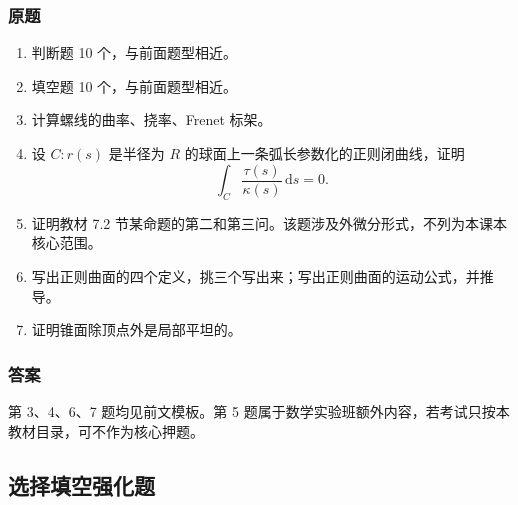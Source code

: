 \documentclass[UTF8,12pt,a4paper]{ctexart}
\newcommand{\dd}{\,\mathrm d}
\begin{document}
\subsubsection*{原题}
\begin{enumerate}
\item 判断题 10 个，与前面题型相近。
\item 填空题 10 个，与前面题型相近。
\item 计算螺线的曲率、挠率、Frenet 标架。
\item 设 $C:r(s)$ 是半径为 $R$ 的球面上一条弧长参数化的正则闭曲线，证明
\[
\int_C\frac{\tau(s)}{\kappa(s)}\dd s=0.
\]
\item 证明教材 7.2 节某命题的第二和第三问。该题涉及外微分形式，不列为本课本核心范围。
\item 写出正则曲面的四个定义，挑三个写出来；写出正则曲面的运动公式，并推导。
\item 证明锥面除顶点外是局部平坦的。
\end{enumerate}
\subsubsection*{答案}
第 3、4、6、7 题均见前文模板。第 5 题属于数学实验班额外内容，若考试只按本教材目录，可不作为核心押题。

\subsection{选择填空强化题}
\end{document}
